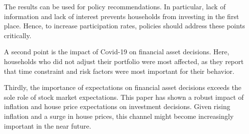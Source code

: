 \documentclass[ProjectABM]{subfiles}
\begin{document}
The results can be used for policy recommendations. In particular, lack of information and lack of interest prevents households from investing in the first place. Hence, to increase participation rates, policies should address these points critically.


A second point is the impact of Covid-19 on financial asset decisions. Here, households who did not adjust their portfolio were most affected, as they report that time constraint and risk factors were most important for their behavior.


Thirdly, the importance of expectations on financial asset decisions exceeds the sole role of stock market expectations. This paper has shown a robust impact of inflation and house price expectations on investment decisions. Given rising inflation and a surge in house prices, this channel might become increasingly important in the near future.

\end{document}
